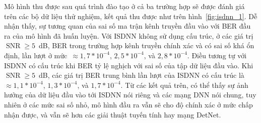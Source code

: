 Mô hình thu được sau quá trình đào tạo ở cả ba trường hợp sẽ được đánh giá trên các bộ dữ liệu thử nghiệm, kết quả thu được như trên hình~\ref{fig:isdnn_1}. Dễ nhận thấy, sự tương quan của sai số ma trận kênh truyền đầu vào với BER đầu ra của mô hình đã huấn luyện. Với ISDNN không sử dụng cấu trúc, ở các giá trị $\operatorname{SNR}\ge 5$~dB, BER trong trường hợp kênh truyền chính xác và có sai số khá ổn định, lần lượt ở mức~$\approx 1,7 * 10^{-4}$, $2,5* 10^{-4}$, và $2,8* 10^{-4}$. 
Điều tương tự với ISDNN có cấu trúc khi BER tỷ lệ nghịch với sai số của tập dữ liệu đầu vào. Khi $\operatorname{SNR}\ge 5$~dB, các giá trị BER trung bình lần lượt của ISDNN có cấu trúc là~$\approx 1,1 * 10^{-4}$, $1,3* 10^{-4}$, và $1,7* 10^{-4}$. 
Từ các kết quả trên, có thể thấy sự ảnh hưởng của dữ liệu đầu vào tới ISDNN nói riêng và các mạng DNN nói chung, tuy nhiên ở các mức sai số nhỏ, mô hình đầu ra vẫn sẽ cho độ chính xác ở mức chấp nhận được, và vẫn sẽ hơn các giải thuật tuyến tính hay mạng DetNet.

